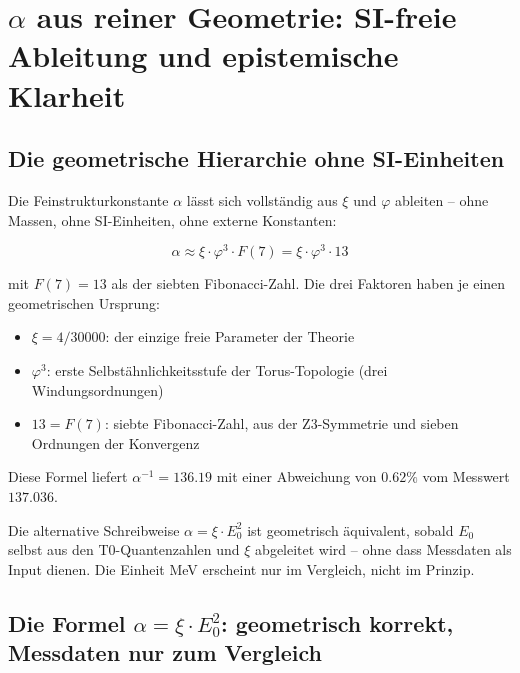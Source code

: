\documentclass[12pt, a4paper]{article}
\newcommand{\xipar}{\xi}
\begin{document}
\section{$\alpha$ aus reiner Geometrie: SI-freie Ableitung und epistemische Klarheit}

\subsection{Die geometrische Hierarchie ohne SI-Einheiten}

Die Feinstrukturkonstante $\alpha$ lässt sich vollständig aus $\xipar$ und $\varphi$ ableiten -- ohne Massen, ohne SI-Einheiten, ohne externe Konstanten:

\begin{equation}
  \alpha \approx \xipar \cdot \varphi^3 \cdot F(7) = \xipar \cdot \varphi^3 \cdot 13
\end{equation}

mit $F(7) = 13$ als der siebten Fibonacci-Zahl. Die drei Faktoren haben je einen geometrischen Ursprung:
\begin{itemize}[noitemsep]
  \item $\xipar = 4/30000$: der einzige freie Parameter der Theorie
  \item $\varphi^3$: erste Selbstähnlichkeitsstufe der Torus-Topologie (drei Windungsordnungen)
  \item $13 = F(7)$: siebte Fibonacci-Zahl, aus der Z3-Symmetrie und sieben Ordnungen der Konvergenz
\end{itemize}

Diese Formel liefert $\alpha^{-1} = 136.19$ mit einer Abweichung von $0.62\%$ vom Messwert $137.036$.

\medskip
Die alternative Schreibweise $\alpha = \xipar \cdot E_0^2$ ist geometrisch äquivalent, sobald $E_0$ selbst aus den T0-Quantenzahlen und $\xipar$ abgeleitet wird -- ohne dass Messdaten als Input dienen. Die Einheit MeV erscheint nur im Vergleich, nicht im Prinzip.

\subsection{Die Formel $\alpha = \xipar \cdot E_0^2$: geometrisch korrekt, Messdaten nur zum Vergleich}
\end{document}
